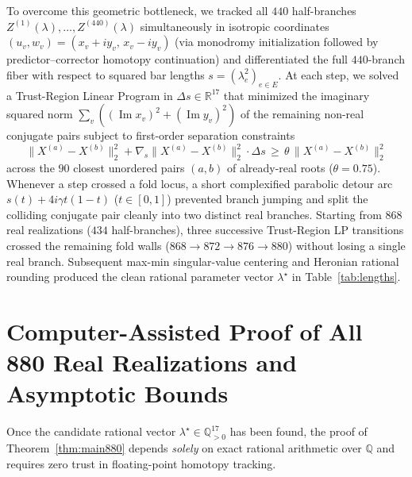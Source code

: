 \documentclass[11pt,a4paper]{article}
\theoremstyle{definition}
\theoremstyle{remark}
\begin{document}
To overcome this geometric bottleneck, we tracked all $440$ half-branches $Z^{(1)}(\lambda), \dots, Z^{(440)}(\lambda)$ simultaneously in isotropic coordinates $(u_v, w_v) = (x_v + i y_v,\, x_v - i y_v)$ (via monodromy initialization followed by predictor--corrector homotopy continuation) and differentiated the full $440$-branch fiber with respect to squared bar lengths $s = (\lambda_e^2)_{e \in E}$. At each step, we solved a Trust-Region Linear Program in $\Delta s \in \mathbb{R}^{17}$ that minimized the imaginary squared norm $\sum_{v} ((\operatorname{Im} x_v)^2 + (\operatorname{Im} y_v)^2)$ of the remaining non-real conjugate pairs subject to first-order separation constraints
\[
\|X^{(a)} - X^{(b)}\|_2^2 + \nabla_s \|X^{(a)} - X^{(b)}\|_2^2 \cdot \Delta s \,\ge\, \theta \, \|X^{(a)} - X^{(b)}\|_2^2
\]
across the $90$ closest unordered pairs $(a,b)$ of already-real roots ($\theta = 0.75$). Whenever a step crossed a fold locus, a short complexified parabolic detour arc $s(t) + 4 i \gamma t(1-t)$ ($t \in [0,1]$) prevented branch jumping and split the colliding conjugate pair cleanly into two distinct real branches. Starting from $868$ real realizations ($434$ half-branches), three successive Trust-Region LP transitions crossed the remaining fold walls ($868 \to 872 \to 876 \to 880$) without losing a single real branch. Subsequent max-min singular-value centering and Heronian rational rounding produced the clean rational parameter vector $\lambda^\star$ in Table~\ref{tab:lengths}.

\section{Computer-Assisted Proof of All 880 Real Realizations and Asymptotic Bounds}

Once the candidate rational vector $\lambda^\star \in \mathbb{Q}_{>0}^{17}$ has been found, the proof of Theorem~\ref{thm:main880} depends \emph{solely} on exact rational arithmetic over $\mathbb{Q}$ and requires zero trust in floating-point homotopy tracking.
\end{document}
